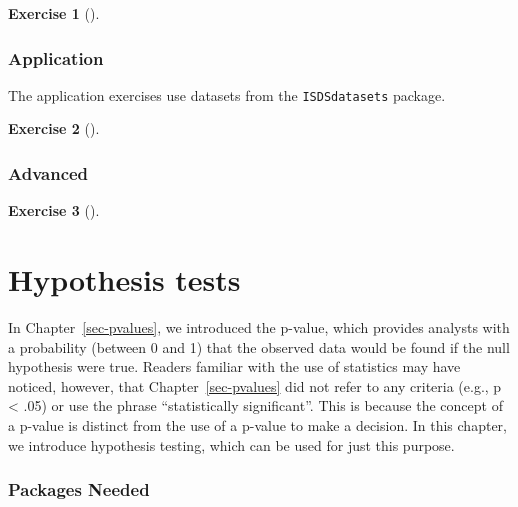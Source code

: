 \documentclass[
  letterpaper,
  DIV=11,
  numbers=noendperiod]{scrreprt}
\theoremstyle{definition}
\newtheorem{exercise}{Exercise}[chapter]
\theoremstyle{remark}
\begin{document}
\leavevmode{}%
\begin{exercise}[]\label{exr-ch11-c01}

\end{exercise}

\hypertarget{sec-ex11-application}{%
\subsection{Application}\label{sec-ex11-application}}

The application exercises use datasets from the \texttt{ISDSdatasets}
package.

\leavevmode{}%
\begin{exercise}[]\label{exr-ch11-app1}

\end{exercise}

\hypertarget{sec-ex11-advanced}{%
\subsection{Advanced}\label{sec-ex11-advanced}}

\leavevmode{}%
\begin{exercise}[]\label{exr-ch11-adv1}

\end{exercise}

\hypertarget{sec-hypothesis-tests}{%
\chapter{Hypothesis tests}\label{sec-hypothesis-tests}}

In Chapter~\ref{sec-pvalues}, we introduced the p-value, which provides
analysts with a probability (between 0 and 1) that the observed data
would be found if the null hypothesis were true. Readers familiar with
the use of statistics may have noticed, however, that
Chapter~\ref{sec-pvalues} did not refer to any criteria (e.g., p
\textless{} .05) or use the phrase ``statistically significant''. This
is because the concept of a p-value is distinct from the use of a
p-value to make a decision. In this chapter, we introduce hypothesis
testing, which can be used for just this purpose.

\hypertarget{packages-needed-5}{%
\subsection*{Packages Needed}\label{packages-needed-5}}
\end{document}
